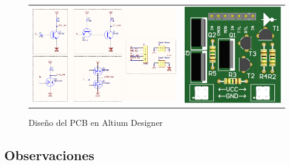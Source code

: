 \begin{figure}[H]
    \centering
        \begin{tabular}{c c}
            \includegraphics[scale=0.4]{../EJ1/Recursos/esquematico.PNG} &
            \includegraphics[scale=0.3]{../EJ1/Recursos/pcb3d.PNG} 
        \end{tabular}
    \caption{Dise\~no del PCB en Altium Designer}
    \label{fig:pcb_design_nots}
\end{figure}

\subsection{Observaciones}


